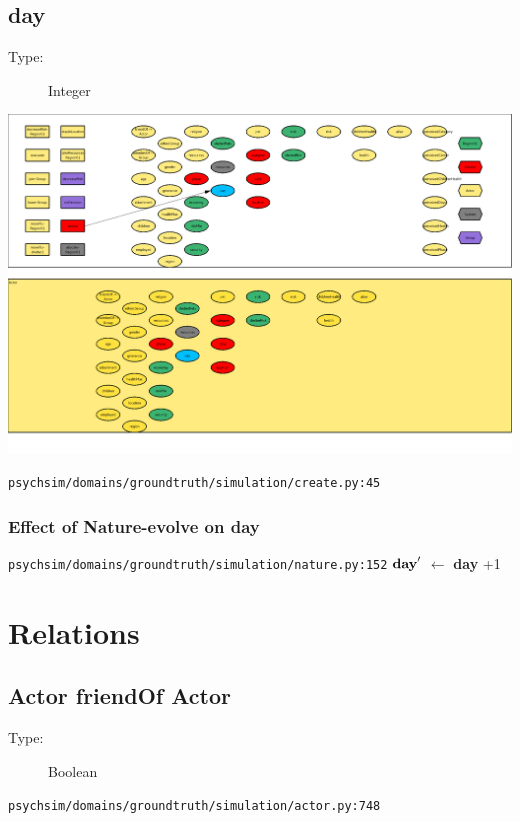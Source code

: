 \documentclass{article}%
\begin{document}
\subsection{day}%
\label{subsec:day}%
\begin{description}%
\item[Type:]%
Integer%
\end{description}%
\includegraphics[width=\textwidth]{images/day.png}%
\begin{flushleft}%
\verb|psychsim/domains/groundtruth/simulation/create.py:45|%
\end{flushleft}%
\subsubsection{Effect of Nature{-}evolve on day}%
\label{ssubsec:Effect of Nature{-}evolve on day}%
\begin{flushleft}%
\verb|psychsim/domains/groundtruth/simulation/nature.py:152|%
\linebreak%
$\mbox{\textbf{day}} '$%
$\leftarrow$%
\textbf{day}%
+1%
\end{flushleft}

%
\section{Relations}%
\label{sec:Relations}%
\subsection{Actor friendOf Actor}%
\label{subsec:Actor friendOf Actor}%
\begin{description}%
\item[Type:]%
Boolean%
\end{description}%
\begin{flushleft}%
\verb|psychsim/domains/groundtruth/simulation/actor.py:748|%
\end{flushleft}
\end{document}
